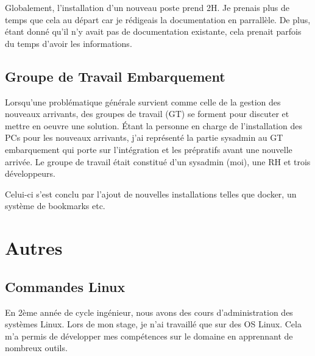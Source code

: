 \documentclass[12pt, a4paper, twoside]{article}
\begin{document}
Globalement, l'installation d'un nouveau poste prend 2H. 
Je prenais plus de temps que cela au départ car je rédigeais la documentation en parrallèle. 
De plus, étant donné qu'il n'y avait pas de documentation existante, cela prenait parfois du temps d'avoir les informations. 

\subsection{Groupe de Travail Embarquement}
Lorsqu'une problématique générale survient comme celle de la gestion des nouveaux arrivants, des groupes de travail (GT) se forment pour discuter et mettre en oeuvre une solution.
Étant la personne en charge de l'installation des PCs pour les nouveaux arrivants, j'ai représenté la partie sysadmin au GT embarquement qui porte sur l'intégration et les prépratifs avant une nouvelle arrivée.
Le groupe de travail était constitué d'un sysadmin (moi), une RH et trois développeurs.

Celui-ci s'est conclu par l'ajout de nouvelles installations telles que docker, un système de bookmarks etc.
\newpage
\section{Autres}
\subsection{Commandes Linux}
En 2ème année de cycle ingénieur, nous avons des cours d'administration des systèmes \gls{Linux}.
Lors de mon stage, je n'ai travaillé que sur des OS \gls{Linux}.
Cela m'a permis de développer mes compétences sur le domaine en apprennant de nombreux outils.
\end{document}
